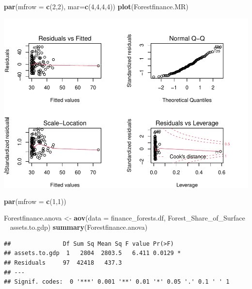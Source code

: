 \documentclass[
  12pt,
]{article}
\newenvironment{Shaded}{\begin{snugshade}}{\end{snugshade}}
\newcommand{\DataTypeTok}[1]{\textcolor[rgb]{0.13,0.29,0.53}{#1}}
\newcommand{\DecValTok}[1]{\textcolor[rgb]{0.00,0.00,0.81}{#1}}
\newcommand{\KeywordTok}[1]{\textcolor[rgb]{0.13,0.29,0.53}{\textbf{#1}}}
\newcommand{\NormalTok}[1]{#1}
\newcommand{\OperatorTok}[1]{\textcolor[rgb]{0.81,0.36,0.00}{\textbf{#1}}}
\newcommand{\StringTok}[1]{\textcolor[rgb]{0.31,0.60,0.02}{#1}}
\begin{document}
\begin{Shaded}
\begin{Highlighting}[]
\KeywordTok{par}\NormalTok{(}\DataTypeTok{mfrow =} \KeywordTok{c}\NormalTok{(}\DecValTok{2}\NormalTok{,}\DecValTok{2}\NormalTok{), }\DataTypeTok{mar=}\KeywordTok{c}\NormalTok{(}\DecValTok{4}\NormalTok{,}\DecValTok{4}\NormalTok{,}\DecValTok{4}\NormalTok{,}\DecValTok{4}\NormalTok{))}
\KeywordTok{plot}\NormalTok{(Forestfinance.MR)}
\end{Highlighting}
\end{Shaded}

\includegraphics{Final_Project_Code_files/figure-latex/unnamed-chunk-7-1.pdf}

\begin{Shaded}
\begin{Highlighting}[]
\KeywordTok{par}\NormalTok{(}\DataTypeTok{mfrow =} \KeywordTok{c}\NormalTok{(}\DecValTok{1}\NormalTok{,}\DecValTok{1}\NormalTok{))}
\end{Highlighting}
\end{Shaded}

\begin{Shaded}
\begin{Highlighting}[]
\NormalTok{Forestfinance.anova <-}\StringTok{ }\KeywordTok{aov}\NormalTok{(}\DataTypeTok{data =}\NormalTok{ finance_forests.df, Forest_Share_of_Surface }\OperatorTok{~}\StringTok{ }\NormalTok{assets.to.gdp)}
\KeywordTok{summary}\NormalTok{(Forestfinance.anova)}
\end{Highlighting}
\end{Shaded}

\begin{verbatim}
##               Df Sum Sq Mean Sq F value Pr(>F)  
## assets.to.gdp  1   2804  2803.5   6.411 0.0129 *
## Residuals     97  42418   437.3                 
## ---
## Signif. codes:  0 '***' 0.001 '**' 0.01 '*' 0.05 '.' 0.1 ' ' 1
\end{verbatim}
\end{document}
